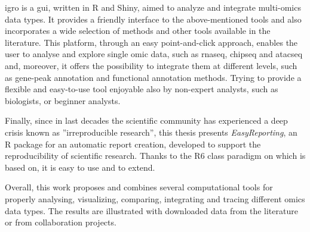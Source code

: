 \gls{igro} is a \gls{gui}, written in R and Shiny, aimed to analyze and integrate multi-omics data types. 
It provides a friendly interface to the above-mentioned tools and also incorporates a wide selection of methods and other tools available in the literature. This platform, through an easy point-and-click approach, enables the user to analyse and explore single omic data, such as \gls{rnaseq}, \gls{chipseq} and \gls{atacseq} and, moreover, it offers the possibility to integrate them at different levels, such as gene-peak annotation and functional annotation methods.
Trying to provide a flexible and easy-to-use tool enjoyable also by non-expert analysts, such as biologists, or beginner analysts.

Finally, since in last decades the scientific community has experienced a deep crisis known as ''irreproducible research'', this thesis presents \textit{EasyReporting}, an R package for an automatic report creation, developed to support the reproducibility of scientific research.  
Thanks to the R6 class paradigm on which is based on, it is easy to use and to extend.

Overall, this work proposes and combines several computational tools for properly analysing, visualizing, comparing, integrating and tracing different omics data types.
The results are illustrated with downloaded data from the literature or from collaboration projects.